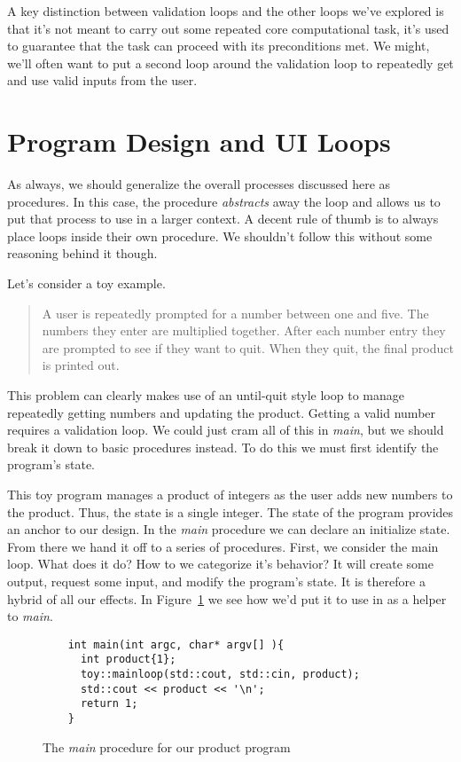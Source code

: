 \documentclass[]{tufte-handout}
\begin{document}
A key distinction between validation loops and the other loops we've explored is that it's not meant to carry out some repeated core computational task, it's used to guarantee that the task can proceed with its preconditions met. We might, we'll often want to put a second loop around the validation loop to repeatedly get and use valid inputs from the user.

\section{Program Design and UI Loops}

As always, we should generalize the overall processes discussed here as procedures. In this case, the procedure \textit{abstracts} away the loop and allows us to put that process to use in a larger context. A decent rule of thumb is to always place loops inside their own procedure. We shouldn't follow this without some reasoning behind it though.

Let's consider a toy example.
\begin{quote}
  A user is repeatedly prompted for a number between one and five. The numbers they enter are multiplied together. After each number entry they are prompted to see if they want to quit. When they quit, the final product is printed out.
\end{quote}

This problem can clearly makes use of an until-quit style loop to manage repeatedly getting numbers and updating the product. Getting a valid number requires a validation loop. We could just cram all of this in \textit{main}, but we should break it down to basic procedures instead. To do this we must first identify the program's state.

This toy program manages a product of integers as the user adds new numbers to the product. Thus, the state is a single integer. The state of the program provides an anchor to our design.  In the \textit{main} procedure we can declare an initialize state. From there we hand it off to a series of procedures. First, we consider the main loop. What does it do? How to we categorize it's behavior? It will create some output, request some input, and modify the program's state. It is therefore a hybrid of all our effects. In Figure~\ref{ex:main} we see how we'd put it to use in as a helper to \textit{main}.

\begin{figure}
  \begin{lstlisting}
    int main(int argc, char* argv[] ){
      int product{1};
      toy::mainloop(std::cout, std::cin, product);
      std::cout << product << '\n';
      return 1;
    }
  \end{lstlisting}
\caption{The \textit{main} procedure for our product program}
\label{ex:main}
\end{figure}
\end{document}
